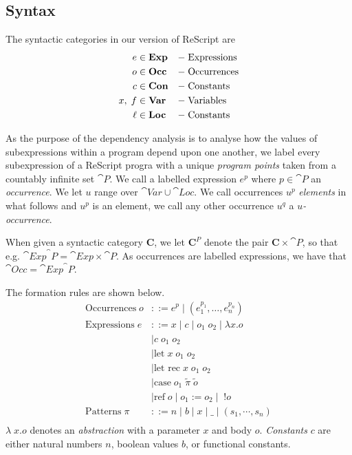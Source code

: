 \documentclass[acmsmall,sigplan]{acmart}
\begin{document}
\subsection{Syntax}

The syntactic categories in our version of ReScript are
%
\begin{align*}
	e\in &\;\textbf{Exp} &-\;&\mbox{Expressions} \\
	o\in &\;\textbf{Occ} &-\;&\mbox{Occurrences} \\
	c\in &\;\textbf{Con} &-\;&\mbox{Constants} \\
	x,\;f\in &\;\textbf{Var} &-\;&\mbox{Variables} \\
	\ell\in &\;\textbf{Loc} &-\;&\mbox{Constants}
\end{align*}

As the purpose of the dependency analysis is to analyse how the values
of subexpressions within a program depend upon one another, we label
every subexpression of a ReScript progra with a unique \emph{program
  points} taken from a countably infinite set $\cat{P}$. We call a
labelled expression $e^p$ where $p \in \cat{P}$ an
\emph{occurrence}. We let $u$ range over $\cat{Var} \cup
\cat{Loc}$. We call occurrences $u^p$ \emph{elements} in what follows and $u^p$
is an element, we call any other occurrence $u^q$ a \emph{$u$-occurrence}.

When given a syntactic category $\mathbf{C}$, we let $\mathbf{C}^{P}$
denote the pair $\mathbf{C}\times\cat{P}$, so that e.g.
$\cat{Exp}^\cat{P}=\cat{Exp}\times\cat{P}$. As occurrences are
labelled expressions, we have that $\cat{Occ}=\cat{Exp}^\cat{P}$.

The formation rules are shown below.
%
\begin{align*}
  \text{Occurrences} \; o &::= e^p \mid (e^{p_1}_1, \ldots,
                                 e^{p_n}_n) \\[5mm]
\text{Expressions} \; e &::= x \mid c \mid o_1\;o_2 \mid \lambda x.o\\
			& \mid c \; o_1 \; o_2\\
			& \mid \mbox{let} \; x \; o_1 \; o_2 \\
			& \mid \mbox{let rec} \; x \; o_1 \; o_2 \\
			& \mid \mbox{case} \; o_1 \; \tilde{\pi} \; \tilde{o}\\
			& \mid \mbox{ref} \; o \mid o_1 := o_2 \mid \; !o\\[5mm]
  \text{Patterns} \; \pi &::= n \mid b \mid x \mid \_  \mid
                                (s_1,\cdots,s_n)\\
\end{align*}
%
$\lambda\;x.o$ denotes an \emph{abstraction} with a parameter $x$ and body $o$.
\emph{Constants} $c$ are either natural numbers $n$, boolean values $b$, or functional constants.
\end{document}
